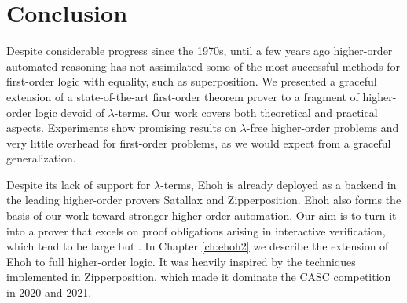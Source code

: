 \section{Conclusion}
\label{sec:ehoh:conclusion}

Despite considerable progress since the 1970s, until a few years ago higher-order automated
reasoning has not assimilated some of the most successful methods for
first-order logic with equality, such as superposition. We presented a
graceful extension of a state-of-the-art first-order theorem prover to a
fragment of higher-order logic devoid of $\lambda$-terms. Our work
covers both theoretical and practical aspects. Experiments show promising
results on $\lambda$-free higher-order problems and very little overhead for
first-order problems, as we would expect from a graceful generalization.

\begin{sloppypar}
Despite its lack of support for $\lambda$-terms, Ehoh is already deployed
as a backend in the leading higher-order provers Satallax and
Zipperposition. Ehoh also forms the basis of our work toward stronger
higher-order automation. Our aim is to turn it into a prover that excels on
proof obligations arising in interactive verification, which tend to be
large but  \cite{ns-13-leo2sh}.
In Chapter \ref{ch:ehoh2} we describe the extension of Ehoh to full higher-order logic.
It was heavily inspired by the techniques implemented in Zipperposition, which made it
dominate the CASC competition in 2020 and 2021.
\end{sloppypar}
